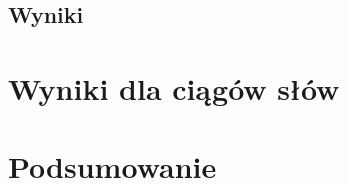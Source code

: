 \documentclass[eng,printmode]{mgr}
\begin{document}
 \section{Wyniki}

\chapter{Wyniki dla ciągów słów}

\chapter{Podsumowanie}

%


 \listoffigures
 \listoftables
\end{document}
